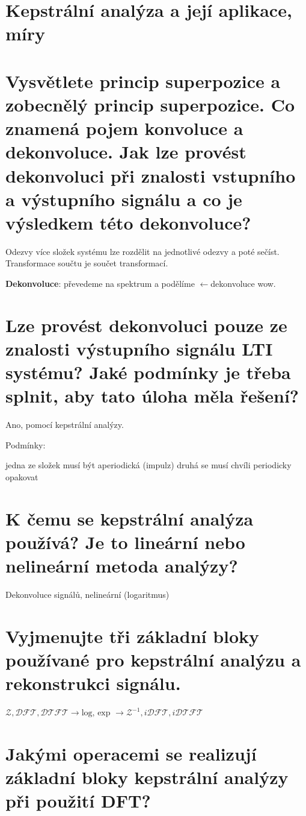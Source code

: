 \documentclass[a4paper,12pt]{article}   %
\newcommand{\llarr}{$\leftarrow$}
\newcommand{\mt}[1]{$#1$}
\newcommand{\okruh}[1]{\section*{\Large #1}}
\begin{document}
\clearpage

\okruh{Kepstrální analýza a její aplikace, míry}
\section{Vysvětlete princip superpozice a zobecnělý princip superpozice. Co znamená pojem konvoluce a dekonvoluce. Jak lze provést dekonvoluci při znalosti vstupního a výstupního signálu a co je výsledkem této dekonvoluce?}
Odezvy více složek systému lze rozdělit na jednotlivé odezvy a poté sečíst. Transformace součtu je součet transformací. 

\textbf{Dekonvoluce}: převedeme na spektrum a podělíme \llarr dekonvoluce wow. 


\section{Lze provést dekonvoluci pouze ze znalosti výstupního signálu LTI systému? Jaké podmínky je třeba splnit, aby tato úloha měla řešení?}

Ano, pomocí kepstrální analýzy.

Podmínky:
\begin{outline}
        \1 jedna ze složek musí být aperiodická (impulz)
        \1 druhá se musí chvíli periodicky opakovat
\end{outline}


\section{K čemu se kepstrální analýza používá? Je to lineární nebo nelineární metoda analýzy?}

Dekonvoluce signálů, nelineární (logaritmus)


\section{Vyjmenujte tři základní bloky používané pro kepstrální analýzu a rekonstrukci signálu.}

\mt{\mathscr{Z}, \mathscr{DFT}, \mathscr{DTFT} \rightarrow \text{log, exp }\rightarrow \mathscr{Z}^{-1}, i\mathscr{DFT}, i\mathscr{DTFT}}


\section{Jakými operacemi se realizují základní bloky kepstrální analýzy při použití DFT?}
\end{document}
